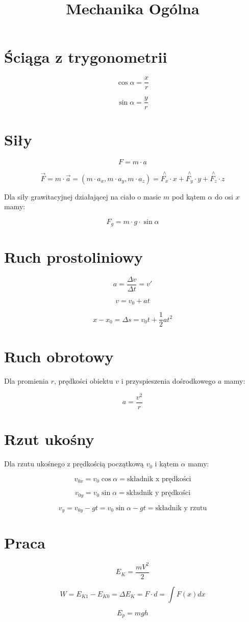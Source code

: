\documentclass{../notatki}
\title{Mechanika Ogólna}
\begin{document}
\tableofcontents

\section{Ściąga z trygonometrii}

$$
\cos \alpha = \frac{x}{r}
$$

$$
\sin \alpha = \frac{y}{r}
$$

\section{Siły}

$$
F = m \cdot a
$$

$$
\vec{F} = m \cdot \vec{a} = (m \cdot a_x, m \cdot a_y, m \cdot a_z) = \stackrel{\wedge}{F_x} \cdot x + \stackrel{\wedge}{F_y} \cdot y + \stackrel{\wedge}{F_z} \cdot z 
$$

Dla siły grawitacyjnej działającej na ciało o masie $m$ pod kątem $\alpha$ do osi $x$ mamy:

$$
F_g = m \cdot g \cdot \sin \alpha
$$

\section{Ruch prostoliniowy}

$$
a = \frac{\Delta v}{\Delta t} = v'
$$

$$
v = v_0 + at
$$

$$
x - x_0 = \Delta s = v_0t + \frac{1}{2}a t^2
$$

\section{Ruch obrotowy}

Dla promienia $r$, prędkości obiektu $v$ i przyspieszenia dośrodkowego $a$ mamy:

$$
a = \frac{v^2}{r}
$$

\section{Rzut ukośny}

Dla rzutu ukośnego z prędkością początkową $v_0$ i kątem $\alpha$ mamy:

$$
v_{0x} = v_0 \cos \alpha = \text{składnik x prędkości}
$$

$$
v_{0y} = v_0 \sin \alpha = \text{składnik y prędkości}
$$

$$
v_y = v_{0y} - gt = v_0 \sin \alpha - gt = \text{składnik y rzutu}
$$

\section{Praca}

$$
E_K = \frac{mV^2}{2}
$$

$$
W = E_{K1} - E_{K0} = \Delta E_K = F \cdot d = \int F(x) dx
$$

$$
E_p = mgh 
$$
\end{document}
